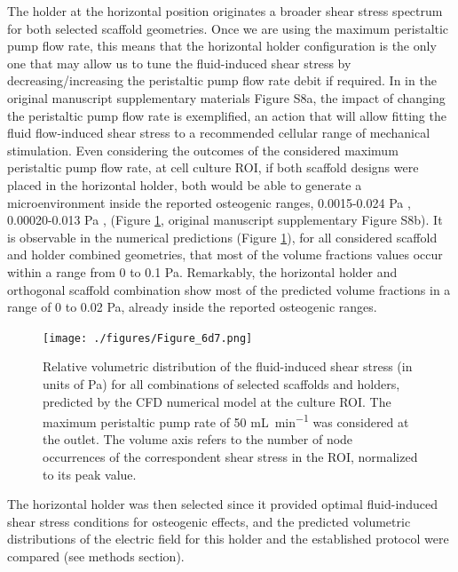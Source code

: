 The holder at the horizontal position originates a broader shear stress spectrum for both selected scaffold geometries. Once we are using the maximum peristaltic pump flow rate, this means that the horizontal holder configuration is the only one that may allow us to tune the fluid-induced shear stress by decreasing/increasing the peristaltic pump flow rate debit if required. In in the original manuscript supplementary materials Figure S8a, the impact of changing the peristaltic pump flow rate is exemplified, an action that will allow fitting the fluid flow-induced shear stress to a recommended cellular range of mechanical stimulation. Even considering the outcomes of the considered maximum peristaltic pump flow rate, at cell culture ROI, if both scaffold designs were placed in the horizontal holder, both would be able to generate a microenvironment inside the reported osteogenic ranges, 0.0015-0.024 \unit{\pascal} \cite{Vetsch2017-zd}, 0.00020-0.013 \unit{\pascal} \cite{Yamada2021-qf}, (Figure \ref{figWSS}, original manuscript supplementary Figure S8b). It is observable in the numerical predictions (Figure \ref{figWSS}), for all considered scaffold and holder combined geometries, that most of the volume fractions values occur within a range from 0 to 0.1 \unit{\pascal}. Remarkably, the horizontal holder and orthogonal scaffold combination show most of the predicted volume fractions in a range of 0 to 0.02 \unit{\pascal}, already inside the reported osteogenic ranges.


\begin{figure}
\centering
\texttt{[image: ./figures/Figure\_6d7.png]}
\caption{Relative volumetric distribution of the fluid-induced shear stress (in units of \unit{\pascal}) for all combinations of selected scaffolds and holders, predicted by the \acs{CFD} numerical model at the culture \acs{ROI}. The maximum peristaltic pump rate of 50 \unit{\milli\liter\per\minute} was considered at the outlet. The volume axis refers to the number of node occurrences of the correspondent shear stress in the \acs{ROI}, normalized to its peak value.}
\label{figWSS}
\end{figure}


The horizontal holder was then selected since it provided optimal fluid-induced shear stress conditions for osteogenic effects, and the predicted volumetric distributions of the electric field for this holder and the established protocol were compared (see methods section). 

